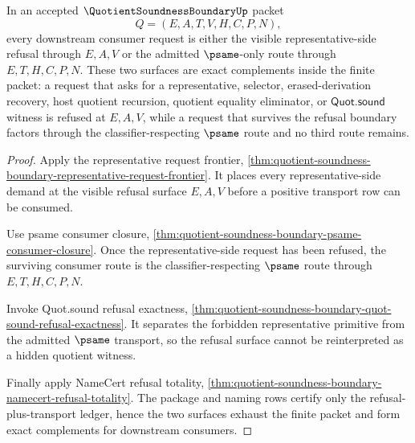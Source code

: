 \begin{theorem}
\label{thm:quotient-soundness-boundary-refusal-exact-complement}
In an accepted $\QuotientSoundnessBoundaryUp$ packet
$$
Q=(E,A,T,V,H,C,P,N),
$$
every downstream consumer request is either the visible representative-side refusal through $E,A,V$ or the admitted $\psame$-only route through $E,T,H,C,P,N$. These two surfaces are exact complements inside the finite packet: a request that asks for a representative, selector, erased-derivation recovery, host quotient recursion, quotient equality eliminator, or $\mathsf{Quot.sound}$ witness is refused at $E,A,V$, while a request that survives the refusal boundary factors through the classifier-respecting $\psame$ route and no third route remains.
\end{theorem}
\begin{proof}
Apply the representative request frontier, \autoref{thm:quotient-soundness-boundary-representative-request-frontier}. It places every representative-side demand at the visible refusal surface $E,A,V$ before a positive transport row can be consumed.

Use psame consumer closure, \autoref{thm:quotient-soundness-boundary-psame-consumer-closure}. Once the representative-side request has been refused, the surviving consumer route is the classifier-respecting $\psame$ route through $E,T,H,C,P,N$.

Invoke Quot.sound refusal exactness, \autoref{thm:quotient-soundness-boundary-quot-sound-refusal-exactness}. It separates the forbidden representative primitive from the admitted $\psame$ transport, so the refusal surface cannot be reinterpreted as a hidden quotient witness.

Finally apply NameCert refusal totality, \autoref{thm:quotient-soundness-boundary-namecert-refusal-totality}. The package and naming rows certify only the refusal-plus-transport ledger, hence the two surfaces exhaust the finite packet and form exact complements for downstream consumers.
\end{proof}

